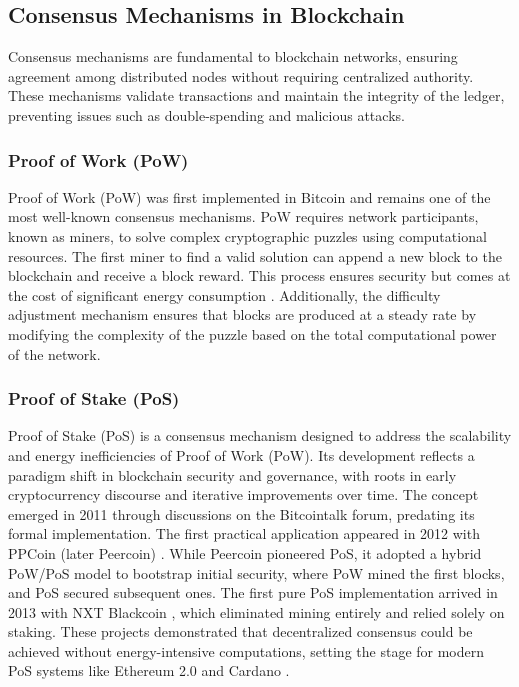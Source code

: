 \documentclass{article}
\begin{document}
\subsection{Consensus Mechanisms in Blockchain}

Consensus mechanisms are fundamental to blockchain networks, ensuring agreement among distributed nodes without requiring centralized authority. These mechanisms validate transactions and maintain the integrity of the ledger, preventing issues such as double-spending and malicious attacks.

\subsubsection{Proof of Work (PoW)}

Proof of Work (PoW) was first implemented in Bitcoin \cite{nakamoto2008bitcoin} and remains one of the most well-known consensus mechanisms. PoW requires network participants, known as miners, to solve complex cryptographic puzzles using computational resources. The first miner to find a valid solution can append a new block to the blockchain and receive a block reward. This process ensures security but comes at the cost of significant energy consumption \cite{narayanan2016bitcoin}. Additionally, the difficulty adjustment mechanism ensures that blocks are produced at a steady rate by modifying the complexity of the puzzle based on the total computational power of the network.

\subsubsection{Proof of Stake (PoS)}

Proof of Stake (PoS) is a consensus mechanism designed to address the scalability and energy inefficiencies of Proof of Work (PoW). Its development reflects a paradigm shift in blockchain security and governance, with roots in early cryptocurrency discourse and iterative improvements over time. The concept emerged in 2011 through discussions on the Bitcointalk forum, predating its formal implementation. The first practical application appeared in 2012 with PPCoin (later Peercoin) \cite{king2012ppcoin}. While Peercoin pioneered PoS, it adopted a hybrid PoW/PoS model to bootstrap initial security, where PoW mined the first blocks, and PoS secured subsequent ones. The first pure PoS implementation arrived in 2013 with NXT Blackcoin \cite{benzinga2020pos}, which eliminated mining entirely and relied solely on staking. These projects demonstrated that decentralized consensus could be achieved without energy-intensive computations, setting the stage for modern PoS systems like Ethereum 2.0 \cite{buterin2020ghost}and Cardano \cite{kiayias2020ouroboros}.
\end{document}
